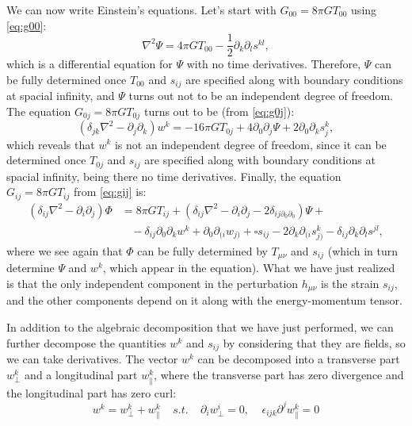 \documentclass[a4paper]{article}
\begin{document}
We can now write Einstein's equations. Let's start with $G_{00} = 8\pi G T_{00}$ using \eqref{eq:g00}:
\begin{equation}
  \nabla^2 \Psi = 4\pi G T_{00} - \frac{1}{2}\partial_k \partial_l s^{kl},
  \label{eq:einstein00}
\end{equation}
which is a differential equation for $\Psi$ with no time derivatives. Therefore, $\Psi$ can be fully determined once $T_{00}$ and $s_{ij}$ are specified along with boundary conditions at spacial infinity, and $\Psi$ turns out not to be an independent degree of freedom. The equation $G_{0j} = 8 \pi G T_{0j}$ turns out to be (from \eqref{eq:g0j}):
\begin{equation}
  (\delta_{jk}\nabla^2 - \partial_j\partial_k)w^k = -16 \pi G T_{0j} + 4\partial_0\partial_j \Psi + 2 \partial_0\partial_k s_j^k,
  \label{eq:einstein0j}
\end{equation}
which reveals that $w^k$ is not an independent degree of freedom, since it can be determined once $T_{0j}$ and $s_{ij}$ are specified along with boundary conditions at spacial infinity, being there no time derivatives. Finally, the equation $G_{ij} = 8 \pi G T_{ij}$ from \eqref{eq:gij} is:
\begin{align}
  (\delta_{ij}\nabla^2 - \partial_i \partial_j)\Phi &= 8 \pi G T_{ij} + (\delta_{ij}\nabla^2 - \partial_i\partial_j - 2\delta_{ij\partial_0\partial_0})\Psi+\nonumber\\
  &\ \ \ \ -\delta_{ij}\partial_0\partial_k w^k + \partial_0 \partial_{(i}w_{j)} + \square s_{ij} - 2\partial_k\partial_{(i}s_{j)}^k-\delta_{ij}\partial_k\partial_ls^{jl},
  \label{eq:einsteinij}
\end{align}
where we see again that $\Phi$ can be fully determined by $T_{\mu\nu}$ and $s_{ij}$ (which in turn determine $\Psi$ and $w^k$, which appear in the equation).
What we have just realized is that the only independent component in the perturbation $h_{\mu\nu}$ is the strain $s_{ij}$, and the other components depend on it along with the energy-momentum tensor.

In addition to the algebraic decomposition that we have just performed, we can further decompose the quantities $w^k$ and $s_{ij}$ by considering that they are fields, so we can take derivatives.
The vector $w^k$ can be decomposed into a transverse part $w^k_{\bot}$ and a longitudinal part $w^k_{\parallel}$, where the transverse part has zero divergence and the longitudinal part has zero curl:
\begin{equation}
  w^k = w^k_{\bot} + w^k_{\parallel}\ \ \ \ \ s.t.\ \ \ \ \ \partial_i w^i_{\bot} = 0,\ \ \ \ \ \epsilon_{ijk}\partial^j w^k_{\parallel} = 0
\end{equation}
\end{document}

